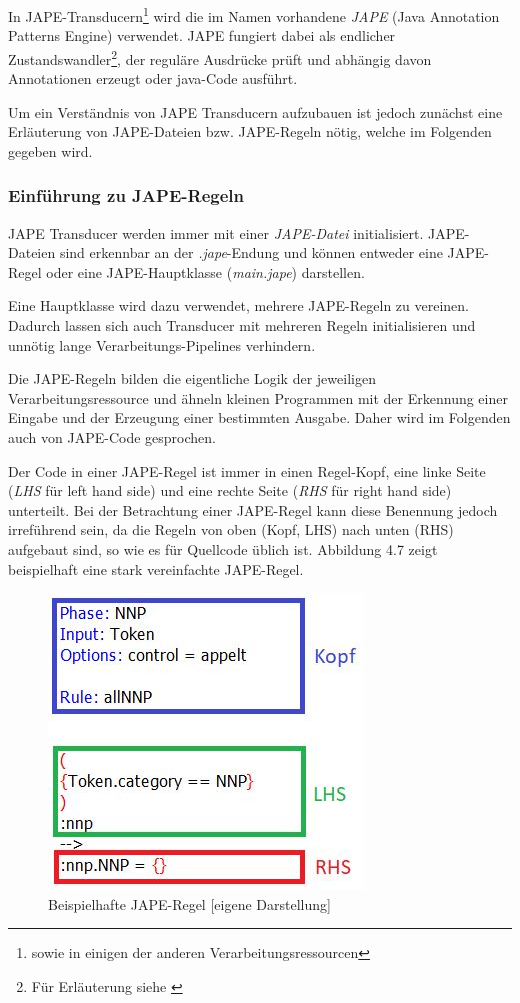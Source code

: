 \documentclass[12pt]{report}
\begin{document}
In JAPE-Transducern\footnote{sowie in einigen der anderen Verarbeitungsressourcen} wird die im Namen vorhandene \textit{JAPE} (Java Annotation Patterns Engine) verwendet. JAPE fungiert dabei als endlicher Zustandswandler\footnote{Für Erläuterung siehe \cite{rs18}}, der reguläre Ausdrücke prüft und abhängig davon Annotationen erzeugt oder java-Code ausführt.\cite{tol09}

Um ein Verständnis von JAPE Transducern aufzubauen ist jedoch zunächst eine Erläuterung von JAPE-Dateien bzw. JAPE-Regeln nötig, welche im Folgenden gegeben wird.

\subsubsection{Einführung zu JAPE-Regeln}
JAPE Transducer werden immer mit einer \textit{JAPE-Datei} initialisiert. JAPE-Dateien sind erkennbar an der \textit{.jape}-Endung und können entweder eine JAPE-Regel oder eine JAPE-Hauptklasse (\textit{main.jape}) darstellen. 

Eine Hauptklasse wird dazu verwendet, mehrere JAPE-Regeln zu vereinen. Dadurch lassen sich auch Transducer mit mehreren Regeln initialisieren und unnötig lange Verarbeitungs-Pipelines verhindern. 

Die JAPE-Regeln bilden die eigentliche Logik der jeweiligen Verarbeitungsressource und ähneln kleinen Programmen mit der Erkennung einer Eingabe und der Erzeugung einer bestimmten Ausgabe. Daher wird im Folgenden auch von JAPE-Code gesprochen. 

Der Code in einer JAPE-Regel ist immer in einen Regel-Kopf, eine linke Seite (\textit{LHS} für left hand side) und eine rechte Seite (\textit{RHS} für right hand side) unterteilt. Bei der Betrachtung einer JAPE-Regel kann diese Benennung jedoch irreführend sein, da die Regeln von oben (Kopf, LHS) nach unten (RHS) aufgebaut sind, so wie es für Quellcode üblich ist. Abbildung 4.7 zeigt beispielhaft eine stark vereinfachte JAPE-Regel.

\begin{figure}[H]
\begin{center}
\includegraphics[scale=1]{Bilder/Regel-Bsp.png}
\caption{Beispielhafte JAPE-Regel [eigene Darstellung]}
\end{center}
\end{figure}
\end{document}
